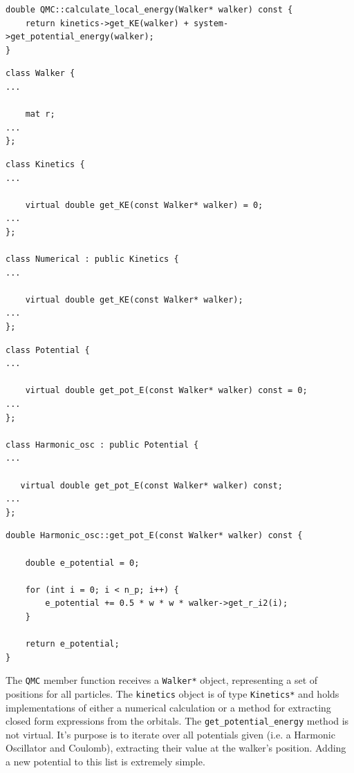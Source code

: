 \vspace{0.5 cm}
\begin{lstlisting}
double QMC::calculate_local_energy(Walker* walker) const {
    return kinetics->get_KE(walker) + system->get_potential_energy(walker);
}
\end{lstlisting}

\begin{lstlisting}
class Walker {
...

    mat r;
...
};
\end{lstlisting}

\begin{lstlisting}
class Kinetics {
...

    virtual double get_KE(const Walker* walker) = 0;
...
};

class Numerical : public Kinetics {
...

    virtual double get_KE(const Walker* walker);
...
};
\end{lstlisting}

\begin{lstlisting}
class Potential {
...

    virtual double get_pot_E(const Walker* walker) const = 0;
...
};

class Harmonic_osc : public Potential {
...
   
   virtual double get_pot_E(const Walker* walker) const;
...
};
\end{lstlisting}

\begin{lstlisting}
double Harmonic_osc::get_pot_E(const Walker* walker) const {

    double e_potential = 0;

    for (int i = 0; i < n_p; i++) {
        e_potential += 0.5 * w * w * walker->get_r_i2(i);
    }

    return e_potential;
}
\end{lstlisting}





The \verb+QMC+ member function receives a \verb+Walker*+ object, representing a set of positions for all particles. The \verb+kinetics+ object is of type \verb+Kinetics*+ and holds implementations of either a numerical calculation or a method for extracting closed form expressions from the orbitals. The \verb+get_potential_energy+ method is not virtual. It's purpose is to iterate over all potentials given (i.e. a Harmonic Oscillator and Coulomb), extracting their value at the walker's position. Adding a new potential to this list is extremely simple. 

